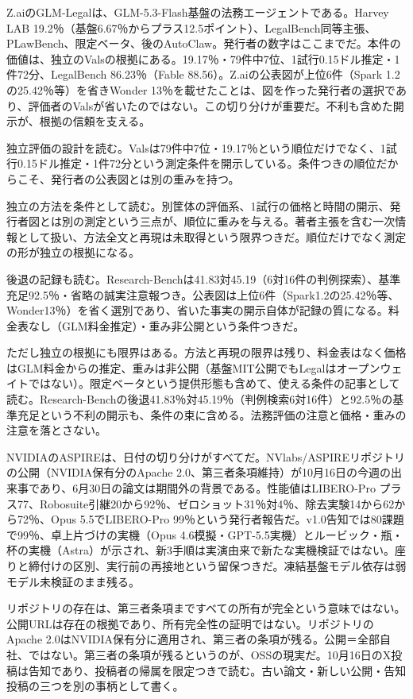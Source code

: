 \documentclass[lualatex,a4paper,10pt]{jlreq}
\begin{document}
Z.aiのGLM-Legalは、GLM-5.3-Flash基盤の法務エージェントである。Harvey LAB 19.2％（基盤6.67％からプラス12.5ポイント）、LegalBench同等主張、PLawBench、限定ベータ、後のAutoClaw。発行者の数字はここまでだ。本件の価値は、独立のValsの根拠にある。19.17％・79件中7位、1試行0.15ドル推定・1件72分、LegalBench 86.23％（Fable 88.56）。Z.aiの公表図が上位6件（Spark 1.2の25.42％等）を省きWonder 13％を載せたことは、図を作った発行者の選択であり、評価者のValsが省いたのではない。この切り分けが重要だ。不利も含めた開示が、根拠の信頼を支える。
\cite{B55,B53,B54}


独立評価の設計を読む。Valsは79件中7位・19.17％という順位だけでなく、1試行0.15ドル推定・1件72分という測定条件を開示している。条件つきの順位だからこそ、発行者の公表図とは別の重みを持つ。
\cite{B55,B53,B54}


独立の方法を条件として読む。別筐体の評価系、1試行の価格と時間の開示、発行者図とは別の測定という三点が、順位に重みを与える。著者主張を含む一次情報として扱い、方法全文と再現は未取得という限界つきだ。順位だけでなく測定の形が独立の根拠になる。
\cite{B55,B53,B54}


後退の記録も読む。Research-Benchは41.83対45.19（6対16件の判例探索）、基準充足92.5％・省略の誠実注意報つき。公表図は上位6件（Spark1.2の25.42％等、Wonder13％）を省く選別であり、省いた事実の開示自体が記録の質になる。料金表なし（GLM料金推定）・重み非公開という条件つきだ。
\cite{B55,B53,B54}


ただし独立の根拠にも限界はある。方法と再現の限界は残り、料金表はなく価格はGLM料金からの推定、重みは非公開（基盤MIT公開でもLegalはオープンウェイトではない）。限定ベータという提供形態も含めて、使える条件の記事として読む。Research-Benchの後退41.83％対45.19％（判例検索6対16件）と92.5％の基準充足という不利の開示も、条件の束に含める。法務評価の注意と価格・重みの注意を落とさない。
\cite{B55,B53,B54}


NVIDIAのASPIREは、日付の切り分けがすべてだ。NVlabs/ASPIREリポジトリの公開（NVIDIA保有分のApache 2.0、第三者条項維持）が10月16日の今週の出来事であり、6月30日の論文は期間外の背景である。性能値はLIBERO-Pro プラス77、Robosuite引継20から92％、ゼロショット31％対4％、除去実験14から62から72％、Opus 5.5でLIBERO-Pro 99％という発行者報告だ。v1.0告知では80課題で99％、卓上片づけの実機（Opus 4.6模擬・GPT-5.5実機）とルービック・瓶・杯の実機（Astra）が示され、新3手順は実演由来で新たな実機検証ではない。座りと締付けの区別、実行前の再接地という留保つきだ。凍結基盤モデル依存は弱モデル未検証のまま残る。
\cite{B57,B56,B89}


リポジトリの存在は、第三者条項まですべての所有が完全という意味ではない。公開URLは存在の根拠であり、所有完全性の証明ではない。リポジトリのApache 2.0はNVIDIA保有分に適用され、第三者の条項が残る。公開＝全部自社、ではない。第三者の条項が残るというのが、OSSの現実だ。10月16日のX投稿は告知であり、投稿者の帰属を限定つきで読む。古い論文・新しい公開・告知投稿の三つを別の事柄として書く。
\cite{B57,B56}
\end{document}
